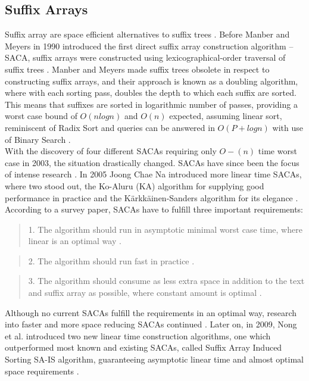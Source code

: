 \documentclass[12pt]{article} %
\begin{document}
\subsection{Suffix Arrays} \label{Suffix Arrays Section}

Suffix array are space efficient alternatives to suffix trees \cite{gusfield,twoeffecient}. Before Manber and Meyers in 1990 introduced the first direct suffix array construction algorithm – SACA, suffix arrays were constructed using lexicographical-order traversal of suffix trees  \cite{gusfield,twoeffecient, performancesuffix, newapproach}. Manber and Meyers made suffix trees obsolete in respect to constructing suffix arrays, and their approach is known as a doubling algorithm, where with each sorting pass, doubles the depth to which each suffix are sorted. This means that suffixes are sorted in logarithmic number of passes, providing a worst case bound of $O(n log n)$ and $O(n)$ expected, assuming linear sort, reminiscent of Radix Sort \cite{performancesuffix} and queries can be answered in $O(P + log n)$ with use of Binary Search \cite{gusfield}.
\\
With the discovery of four different SACAs requiring only $O-(n)$ time worst case in 2003, the situation drastically changed. SACAs have since been the focus of intense research \cite{performancesuffix,newapproach}. In 2005 Joong Chae Na introduced more linear time SACAs, where two stood out, the Ko-Aluru (KA) algorithm for supplying good performance in practice and the Kärkkäinen-Sanders algorithm for its elegance \cite{newapproach}. 
\\
According to a survey paper, SACAs have to fulfill three important requirements: 
\begin{quote}
1. The algorithm should run in asymptotic minimal worst case time, where linear is an optimal way \cite{newapproach}. 
\end{quote}
\begin{quote}
2. The algorithm should run fast in practice \cite{newapproach}.
\end{quote}
\begin{quote}
3. The algorithm should consume as less extra space in addition to the text and suffix array as possible, where constant amount is optimal \cite{newapproach}.
\end{quote}
Although no current SACAs fulfill the requirements in an optimal way, research into faster and more space reducing SACAs continued \cite{newapproach}. Later on, in 2009, Nong et al. introduced two new linear time construction algorithms, one which outperformed most known and existing SACAs, called Suffix Array Induced Sorting SA-IS algorithm, guaranteeing asymptotic linear time and almost optimal space requirements \cite{newapproach}. 
\end{document}

